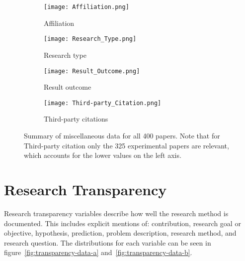 \begin{figure}[!h]
\begin{center}
    \begin{subfigure}[b]{0.45\textwidth}
        \texttt{[image: Affiliation.png]}
        \caption{Affiliation}
        \label{fig:affiliation}
    \end{subfigure}
    \begin{subfigure}[b]{0.45\textwidth}
        \texttt{[image: Research\_Type.png]}
        \caption{Research type}
        \label{fig:research_type}
    \end{subfigure}
    \begin{subfigure}[b]{0.45\textwidth}
        \texttt{[image: Result\_Outcome.png]}
        \caption{Result outcome}
        \label{fig:result_outcome}
    \end{subfigure}
    \begin{subfigure}[b]{0.45\textwidth}
        \texttt{[image: Third-party\_Citation.png]}
        \caption{Third-party citations}
        \label{fig:third-party_citation}
    \end{subfigure}
    \caption[Summary of miscellaneous data.]{Summary of miscellaneous data for all 400 papers. Note that for Third-party citation only the 325 experimental papers are relevant, which accounts for the lower values on the left axis.}
    \label{fig:miscellaneous-data}
\end{center}
\end{figure}
\clearpage

\section{Research Transparency}
Research transparency variables describe how well the research method is documented. This includes explicit mentions of: contribution, research goal or objective, hypothesis, prediction, problem description, research method, and research question. The distributions for each variable can be seen in figure~\ref{fig:transparency-data-a} and~\ref{fig:transparency-data-b}.

